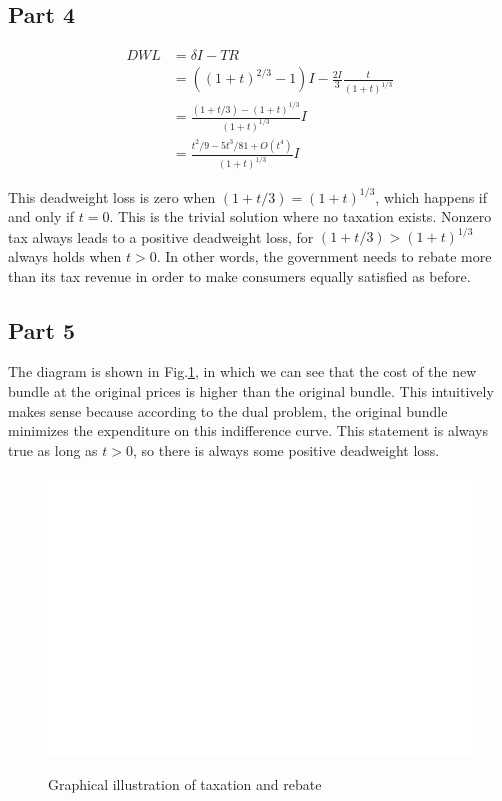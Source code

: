 \documentclass{article}
\begin{document}
\subsection{Part 4}
\begin{align*}
DWL&=\delta I-TR\\
&=\left((1+t)^{2/3}-1\right)I-\frac{2I}{3}\frac{t}{(1+t)^{1/3}}\\
&=\frac{(1+t/3)-(1+t)^{1/3}}{(1+t)^{1/3}}I\\
&=\frac{t^2/9-5t^3/81+O(t^4)}{(1+t)^{1/3}}I
\end{align*}

This deadweight loss is zero when $(1+t/3)=(1+t)^{1/3}$, which happens if and only if $t=0$. This is the trivial solution where no taxation exists. Nonzero tax always leads to a positive deadweight loss, for $(1+t/3)>(1+t)^{1/3}$ always holds when $t>0$. In other words, the government needs to rebate more than its tax revenue in order to make consumers equally satisfied as before.

\subsection{Part 5}
The diagram is shown in Fig.\ref{blank}, in which we can see that the cost of the new bundle at the original prices is higher than the original bundle. This intuitively makes sense because according to the dual problem, the original bundle minimizes the expenditure on this indifference curve. This statement is always true as long as $t>0$, so there is always some positive deadweight loss.
\begin{figure}[!htbp]
	\centering
	\includegraphics[width=12cm]{blank.png}\\
	\caption{Graphical illustration of taxation and rebate}
	\label{blank}
\end{figure}
\end{document}
